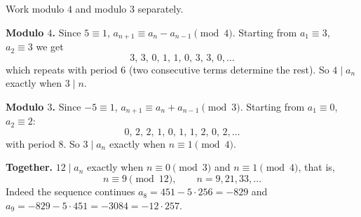 Work modulo $4$ and modulo $3$ separately.

\textbf{Modulo $4$.} Since $5\equiv1$, $a_{n+1}\equiv a_n-a_{n-1}\pmod4$. Starting from $a_1\equiv3$, $a_2\equiv3$ we get
\[
3,\,3,\,0,\,1,\,1,\,0,\,3,\,3,\,0,\dots
\]
which repeats with period $6$ (two consecutive terms determine the rest). So $4\mid a_n$ exactly when $3\mid n$.

\textbf{Modulo $3$.} Since $-5\equiv1$, $a_{n+1}\equiv a_n+a_{n-1}\pmod3$. Starting from $a_1\equiv0$, $a_2\equiv2$:
\[
0,\,2,\,2,\,1,\,0,\,1,\,1,\,2,\,0,\,2,\dots
\]
with period $8$. So $3\mid a_n$ exactly when $n\equiv1\pmod4$.

\textbf{Together.} $12\mid a_n$ exactly when $n\equiv0\pmod3$ and $n\equiv1\pmod4$, that is,
\[
\boxed{n\equiv9\pmod{12}},\qquad n=9,21,33,\dots
\]
Indeed the sequence continues $a_8=451-5\cdot256=-829$ and $a_9=-829-5\cdot451=-3084=-12\cdot257$.
